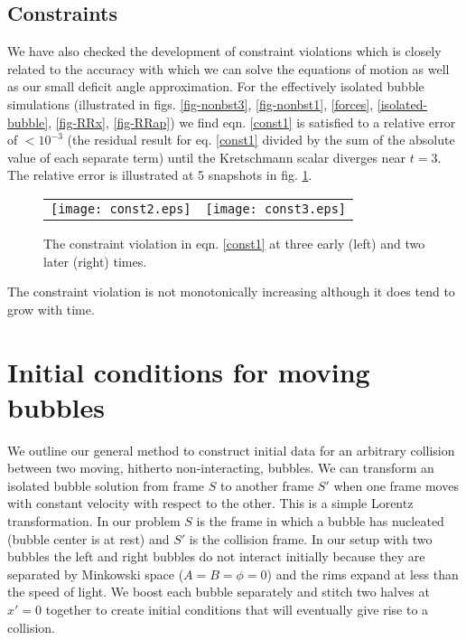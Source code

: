 \documentclass[preprintnumbers,eqsecnum,aps,prd,epsf,showpacs,nofootinbib
]{revtex4}
\begin{document}
\subsection{Constraints}

We have also checked the development of constraint violations
which is closely related to the accuracy with which we can
solve the equations of motion as well as our small deficit
angle approximation. For the effectively isolated
bubble simulations (illustrated in figs. \ref{fig-nonbst3},
\ref{fig-nonbst1},
\ref{forces},
\ref{isolated-bubble},
\ref{fig-RRx},
\ref{fig-RRap})
we find eqn. \ref{const1} is satisfied to a relative
error of $< 10^{-3}$ (the residual result for eq. \ref{const1}
divided by the sum of
the absolute value of each separate term) until the
Kretschmann scalar diverges near $t = 3$. The relative error
is illustrated at 5 snapshots in fig. \ref{constraints}.
\begin{figure}[htbp]
\begin{center}
\begin{tabular}{ll}
\texttt{[image: const2.eps]} &
\hspace{0.5cm}
\texttt{[image: const3.eps]}
\end{tabular}
\end{center}
\caption{The constraint violation in eqn. \ref{const1} at
  three early (left) and two later (right) times.}
\label{constraints}
\end{figure}
The constraint violation is not monotonically increasing
although it does tend to grow with time.

\section{Initial conditions for moving bubbles}

We outline our general method to construct initial data for an
arbitrary collision between two moving, hitherto non-interacting,
bubbles.  We can transform an isolated bubble solution from frame $S$
to another frame $S'$ when one frame moves with constant velocity with
respect to the other. This is a simple Lorentz transformation. In our
problem $S$ is the frame in which a bubble has nucleated (bubble
center is at rest) and $S'$ is the collision frame. In our setup with
two bubbles the left and right bubbles do not interact initially
because they are separated by Minkowski space ($A=B=\phi=0$) and the
rims expand at less than the speed of light. We boost each bubble
separately and stitch two halves at $x'=0$ together to create initial
conditions that will eventually give rise to a collision.
\end{document}

